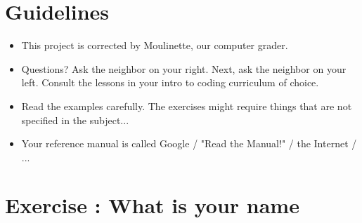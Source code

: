 \documentclass{42-en}
\begin{document}

\chapter{Guidelines}

\begin{itemize}

  \item This project is corrected by Moulinette, our computer grader.
 
  \item Questions? Ask the neighbor on your right. Next, ask the neighbor on your left. Consult the lessons in your intro to coding curriculum of choice.
  
  \item Read the examples carefully. The exercises might require things that are not specified in the subject...

  \item Your reference manual is called Google / "Read the Manual!" / the Internet / ...


\end{itemize}

\newpage


\startexercices



\chapter{Exercise \exercicenumber: What is your name}

\exnumber{\exercicenumber}
\end{document}
